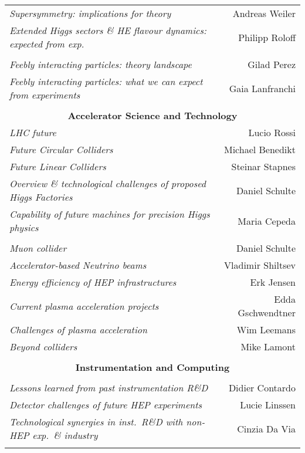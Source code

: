 \begin{flushleft}
\begin{tabular}{lr}
\it Supersymmetry: implications for theory & Andreas Weiler \\
\it Extended Higgs sectors \& HE flavour dynamics: expected from exp. & Philipp Roloff \\
\vspace*{-3mm} & \\
\it Feebly interacting particles: theory landscape & Gilad Perez \\
\it Feebly interacting particles: what we can expect from experiments & Gaia Lanfranchi \\ \hline
\vspace*{-3mm} & \\
\multicolumn{2}{c}{\bf Accelerator Science and Technology} \\
\it LHC future & Lucio Rossi \\
\it Future Circular Colliders & Michael Benedikt \\
\it Future Linear Colliders & Steinar Stapnes \\
\it Overview \& technological challenges of proposed Higgs Factories & Daniel Schulte \\
\it Capability of future machines for precision Higgs physics & Maria Cepeda \\
\vspace*{-3mm} & \\
\it Muon collider & Daniel Schulte \\
\it Accelerator-based Neutrino beams & Vladimir Shiltsev \\
\it Energy efficiency of HEP infrastructures & Erk Jensen \\
\it Current plasma acceleration projects & Edda Gschwendtner \\
\it Challenges of plasma acceleration & Wim Leemans \\
\it Beyond colliders & Mike Lamont \\ \hline
\vspace*{-3mm} & \\
\multicolumn{2}{c}{\bf Instrumentation and Computing} \\
\vspace*{-3mm} & \\
\it Lessons learned from past instrumentation R\&D & Didier Contardo \\
\it Detector challenges of future HEP experiments & Lucie Linssen \\
\it Technological synergies in inst.\ R\&D with non-HEP exp.\ \& industry & Cinzia Da Via \\
\vspace*{-3mm} & \\

\end{tabular}
\end{flushleft}
